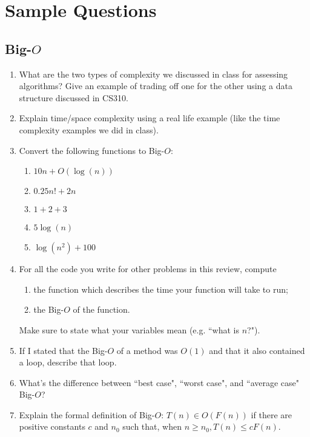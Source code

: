 \documentclass[10pt]{article}
\begin{document}
\pagebreak




















\section{Sample Questions}
\subsection{Big-$O$}
\begin{enumerate}[leftmargin=0em]
    \item What are the two types of complexity we discussed in class for assessing algorithms? Give an example of trading off one for the other using a data structure discussed in CS310.
    \item Explain time/space complexity using a real life example (like the time complexity examples we did in class).
    \item Convert the following functions to Big-$O$:
    \begin{enumerate}
        \item $10n + O(\log(n))$
        \item $0.25n! + 2n$
        \item $1+2+3$ 
        \item $5 \log(n)$
        \item $\log(n^2) + 100$ 
    \end{enumerate}
    \item For all the code you write for other problems in this review, compute
    \begin{enumerate}
        \item the function which describes the time your function will take to run;
        \item the Big-$O$ of the function.
    \end{enumerate}
    Make sure to state what your variables mean (e.g. ``what is $n$?").
    \item If I stated that the Big-$O$ of a method was $O(1)$ and that it also contained a loop, describe that loop.
    \item What's the difference between ``best case", ``worst case", and ``average case" Big-$O$?
    \item Explain the formal definition of Big-$O$: $T(n) \in O(F(n))$ if there are positive constants $c$ and $n_0$ such that, when $n \geq n_0, T(n) \leq cF(n)$.
\end{enumerate}
\end{document}

